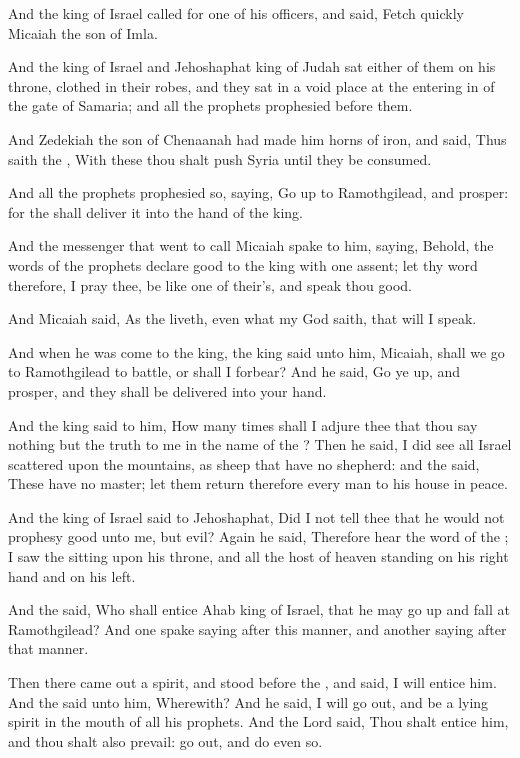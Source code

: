 \Verse And the king of Israel called for one of his officers, and said, Fetch quickly Micaiah the son of Imla.

\Verse And the king of Israel and Jehoshaphat king of Judah sat either of them on his throne, clothed in their robes, and they sat in a void place at the entering in of the gate of Samaria; and all the prophets prophesied before them.

\Verse And Zedekiah the son of Chenaanah had made him horns of iron, and said, Thus saith the \LORD, With these thou shalt push Syria until they be consumed.

\Verse And all the prophets prophesied so, saying, Go up to Ramothgilead, and prosper: for the \LORD shall deliver it into the hand of the king.

\Verse And the messenger that went to call Micaiah spake to him, saying, Behold, the words of the prophets declare good to the king with one assent; let thy word therefore, I pray thee, be like one of their's, and speak thou good.

\Verse And Micaiah said, As the \LORD liveth, even what my God saith, that will I speak.

\Verse And when he was come to the king, the king said unto him, Micaiah, shall we go to Ramothgilead to battle, or shall I forbear?  And he said, Go ye up, and prosper, and they shall be delivered into your hand.

\Verse And the king said to him, How many times shall I adjure thee that thou say nothing but the truth to me in the name of the \LORD?  \Verse Then he said, I did see all Israel scattered upon the mountains, as sheep that have no shepherd: and the \LORD said, These have no master; let them return therefore every man to his house in peace.

\Verse And the king of Israel said to Jehoshaphat, Did I not tell thee that he would not prophesy good unto me, but evil?  \Verse Again he said, Therefore hear the word of the \LORD; I saw the \LORD sitting upon his throne, and all the host of heaven standing on his right hand and on his left.

\Verse And the \LORD said, Who shall entice Ahab king of Israel, that he may go up and fall at Ramothgilead? And one spake saying after this manner, and another saying after that manner.

\Verse Then there came out a spirit, and stood before the \LORD, and said, I will entice him. And the \LORD said unto him, Wherewith?  \Verse And he said, I will go out, and be a lying spirit in the mouth of all his prophets. And the Lord said, Thou shalt entice him, and thou shalt also prevail: go out, and do even so.

